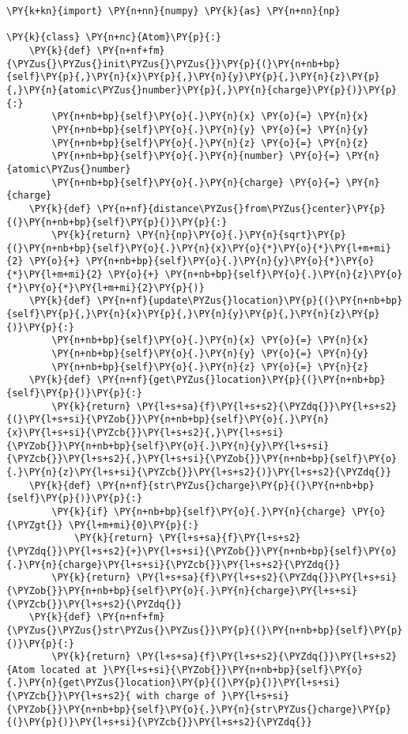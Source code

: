     \begin{tcolorbox}[breakable, size=fbox, boxrule=1pt, pad at break*=1mm,colback=cellbackground, colframe=cellborder]
\begin{Verbatim}[commandchars=\\\{\}]
\PY{k+kn}{import} \PY{n+nn}{numpy} \PY{k}{as} \PY{n+nn}{np}

\PY{k}{class} \PY{n+nc}{Atom}\PY{p}{:}
    \PY{k}{def} \PY{n+nf+fm}{\PYZus{}\PYZus{}init\PYZus{}\PYZus{}}\PY{p}{(}\PY{n+nb+bp}{self}\PY{p}{,}\PY{n}{x}\PY{p}{,}\PY{n}{y}\PY{p}{,}\PY{n}{z}\PY{p}{,}\PY{n}{atomic\PYZus{}number}\PY{p}{,}\PY{n}{charge}\PY{p}{)}\PY{p}{:}
        \PY{n+nb+bp}{self}\PY{o}{.}\PY{n}{x} \PY{o}{=} \PY{n}{x}
        \PY{n+nb+bp}{self}\PY{o}{.}\PY{n}{y} \PY{o}{=} \PY{n}{y}
        \PY{n+nb+bp}{self}\PY{o}{.}\PY{n}{z} \PY{o}{=} \PY{n}{z}
        \PY{n+nb+bp}{self}\PY{o}{.}\PY{n}{number} \PY{o}{=} \PY{n}{atomic\PYZus{}number}
        \PY{n+nb+bp}{self}\PY{o}{.}\PY{n}{charge} \PY{o}{=} \PY{n}{charge}
    \PY{k}{def} \PY{n+nf}{distance\PYZus{}from\PYZus{}center}\PY{p}{(}\PY{n+nb+bp}{self}\PY{p}{)}\PY{p}{:}
        \PY{k}{return} \PY{n}{np}\PY{o}{.}\PY{n}{sqrt}\PY{p}{(}\PY{n+nb+bp}{self}\PY{o}{.}\PY{n}{x}\PY{o}{*}\PY{o}{*}\PY{l+m+mi}{2} \PY{o}{+} \PY{n+nb+bp}{self}\PY{o}{.}\PY{n}{y}\PY{o}{*}\PY{o}{*}\PY{l+m+mi}{2} \PY{o}{+} \PY{n+nb+bp}{self}\PY{o}{.}\PY{n}{z}\PY{o}{*}\PY{o}{*}\PY{l+m+mi}{2}\PY{p}{)}
    \PY{k}{def} \PY{n+nf}{update\PYZus{}location}\PY{p}{(}\PY{n+nb+bp}{self}\PY{p}{,}\PY{n}{x}\PY{p}{,}\PY{n}{y}\PY{p}{,}\PY{n}{z}\PY{p}{)}\PY{p}{:}
        \PY{n+nb+bp}{self}\PY{o}{.}\PY{n}{x} \PY{o}{=} \PY{n}{x}
        \PY{n+nb+bp}{self}\PY{o}{.}\PY{n}{y} \PY{o}{=} \PY{n}{y}
        \PY{n+nb+bp}{self}\PY{o}{.}\PY{n}{z} \PY{o}{=} \PY{n}{z}
    \PY{k}{def} \PY{n+nf}{get\PYZus{}location}\PY{p}{(}\PY{n+nb+bp}{self}\PY{p}{)}\PY{p}{:}
        \PY{k}{return} \PY{l+s+sa}{f}\PY{l+s+s2}{\PYZdq{}}\PY{l+s+s2}{(}\PY{l+s+si}{\PYZob{}}\PY{n+nb+bp}{self}\PY{o}{.}\PY{n}{x}\PY{l+s+si}{\PYZcb{}}\PY{l+s+s2}{,}\PY{l+s+si}{\PYZob{}}\PY{n+nb+bp}{self}\PY{o}{.}\PY{n}{y}\PY{l+s+si}{\PYZcb{}}\PY{l+s+s2}{,}\PY{l+s+si}{\PYZob{}}\PY{n+nb+bp}{self}\PY{o}{.}\PY{n}{z}\PY{l+s+si}{\PYZcb{}}\PY{l+s+s2}{)}\PY{l+s+s2}{\PYZdq{}}
    \PY{k}{def} \PY{n+nf}{str\PYZus{}charge}\PY{p}{(}\PY{n+nb+bp}{self}\PY{p}{)}\PY{p}{:}
        \PY{k}{if} \PY{n+nb+bp}{self}\PY{o}{.}\PY{n}{charge} \PY{o}{\PYZgt{}} \PY{l+m+mi}{0}\PY{p}{:}
            \PY{k}{return} \PY{l+s+sa}{f}\PY{l+s+s2}{\PYZdq{}}\PY{l+s+s2}{+}\PY{l+s+si}{\PYZob{}}\PY{n+nb+bp}{self}\PY{o}{.}\PY{n}{charge}\PY{l+s+si}{\PYZcb{}}\PY{l+s+s2}{\PYZdq{}}
        \PY{k}{return} \PY{l+s+sa}{f}\PY{l+s+s2}{\PYZdq{}}\PY{l+s+si}{\PYZob{}}\PY{n+nb+bp}{self}\PY{o}{.}\PY{n}{charge}\PY{l+s+si}{\PYZcb{}}\PY{l+s+s2}{\PYZdq{}}
    \PY{k}{def} \PY{n+nf+fm}{\PYZus{}\PYZus{}str\PYZus{}\PYZus{}}\PY{p}{(}\PY{n+nb+bp}{self}\PY{p}{)}\PY{p}{:}
        \PY{k}{return} \PY{l+s+sa}{f}\PY{l+s+s2}{\PYZdq{}}\PY{l+s+s2}{Atom located at }\PY{l+s+si}{\PYZob{}}\PY{n+nb+bp}{self}\PY{o}{.}\PY{n}{get\PYZus{}location}\PY{p}{(}\PY{p}{)}\PY{l+s+si}{\PYZcb{}}\PY{l+s+s2}{ with charge of }\PY{l+s+si}{\PYZob{}}\PY{n+nb+bp}{self}\PY{o}{.}\PY{n}{str\PYZus{}charge}\PY{p}{(}\PY{p}{)}\PY{l+s+si}{\PYZcb{}}\PY{l+s+s2}{\PYZdq{}}
        

\end{Verbatim}
\end{tcolorbox}
